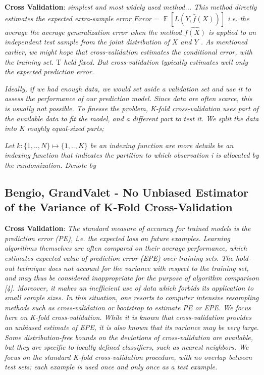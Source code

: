 


\textbf{Cross Validation}:  
\textit{simplest and most widely used method... This method directly estimates the expected extra-sample error
$Error = \mathop{\mathbb{E}}[L(Y,\hat{f}(X))] $ i.e. the average the average generalization error when the method $\hat{f(X)}$ is applied to an independent test sample from the joint distribution of $X$ and $Y$ . As mentioned earlier, we might hope that cross-validation estimates the conditional error, with the training set. $\mathrm{T}$ held fixed. But cross-validation typically estimates well only the expected prediction error.}

\textit{Ideally, if we had enough data, we would set aside a validation set and use it to assess the performance of our prediction model. Since data are often scarce, this is usually not possible. To finesse the problem, K-fold cross-validation uses part of the available data to fit the model, and a different part to test it. We split the data into K roughly equal-sized parts; }

\textit{Let $k : \{1,..,N\} \mapsto \{1, .., K\}$ be an indexing function are more details be an indexing
function that indicates the partition to which observation i is allocated by the randomization. Denote by}


\subsection{Bengio, GrandValet - No Unbiased Estimator of the Variance of K-Fold Cross-Validation}
\textbf{Cross Validation}: 
\textit{The standard measure of accuracy for trained models is the prediction error (PE), i.e. the expected loss on future examples. Learning algorithms themselves are often compared on their average performance, which estimates expected value of prediction error (EPE) over training sets.
The hold-out technique does not account for the variance with respect to the training set, and may thus be considered inappropriate for the purpose of algorithm comparison [4]. Moreover, it makes an inefficient use of data which forbids its application to small sample sizes. In this situation, one resorts to computer intensive resampling methods such as cross-validation or bootstrap to estimate PE or EPE. We focus here on K-fold cross-validation. While it is known that cross-validation provides an unbiased estimate of EPE, it is also known that its variance may be very large.
Some distribution-free bounds on the deviations of cross-validation are available, but they are specific to locally defined classifiers, such as nearest neighbors.
We focus on the standard K-fold cross-validation procedure, with no overlap between test sets: each example is used once and only once as a test example.
}


